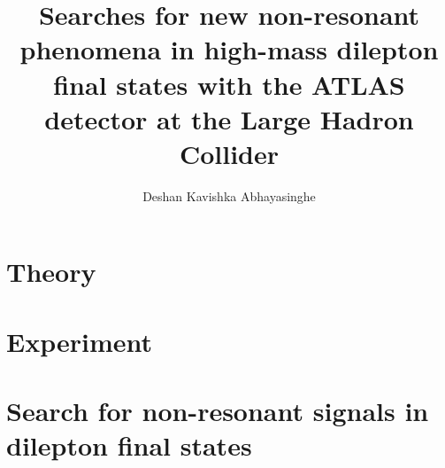 \documentclass[11pt,a4paper,hyperpdf,oneside,nobind]{AJBthesis}
\title{\texorpdfstring{Searches for new non-resonant phenomena in high-mass dilepton final states with the ATLAS detector at the Large Hadron Collider}{Searches for new non-resonant phenomena in high-mass dilepton final states with the ATLAS detector at the Large Hadron Collider}}
\author{Deshan Kavishka Abhayasinghe}
\begin{document}
\begin{frontmatter}
    
\end{frontmatter}

\begin{mainmatter}
    \linenumbers 
    \part{Theory}
    \part{Experiment}
    \part{Search for non-resonant signals in dilepton final states}
\end{mainmatter}

\clearpage

\begin{backmatter}
     
     
        
\end{backmatter}

\let\svaddcontentsline\addcontentsline
    \renewcommand\addcontentsline[3]{%
        \edef\qtest{#1}%
        \def\qmatch{lof}%
        \ifx\qmatch\qtest\else%
            \def\qmatch{lot}%
            \ifx\qmatch\qtest\else%
                \svaddcontentsline{#1}{#2}{#3}%
        \fi\fi%
    }

\end{document}

